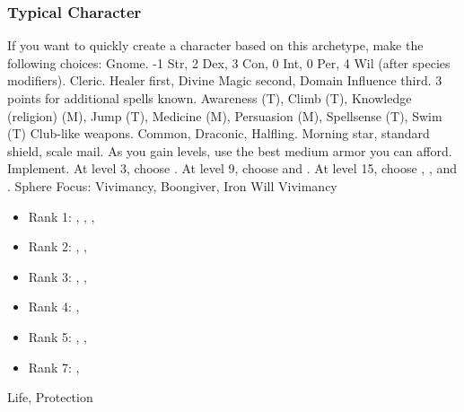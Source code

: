         \subsubsection{Typical Character}
            If you want to quickly create a character based on this archetype, make the following choices:
             Gnome.
             -1 Str, 2 Dex, 3 Con, 0 Int, 0 Per, 4 Wil (after species modifiers).
             Cleric.
             Healer first, Divine Magic second, Domain Influence third.
             3 points for additional spells known.
             Awareness (T), Climb (T), Knowledge (religion) (M), Jump (T), Medicine (M), Persuasion (M), Spellsense (T), Swim (T)
             Club-like weapons.
             Common, Draconic, Halfling.
             Morning star, standard shield, scale mail. As you gain levels, use the best medium armor you can afford.
             Implement.
                At level 3, choose .
                At level 9, choose  and .
                At level 15, choose , , and .
             Sphere Focus: Vivimancy, Boongiver, Iron Will
             Vivimancy
            \begin{itemize}
                \item Rank 1: , , , 
                \item Rank 2: , , 
                \item Rank 3: , , 
                \item Rank 4: , 
                \item Rank 5: , , 
                \item Rank 7: , 
            \end{itemize}
             Life, Protection
